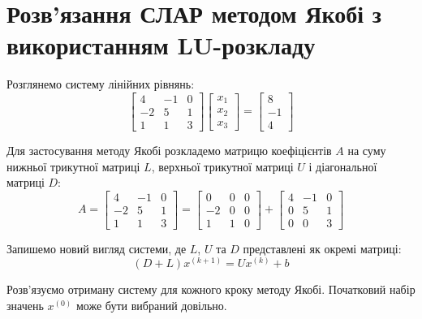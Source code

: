 \documentclass[12pt,a4paper]{article}
\begin{document}
 \section{Розв'язання СЛАР методом Якобі з використанням LU-розкладу}

Розглянемо систему лінійних рівнянь:
\[
\begin{bmatrix}
    4 & -1 & 0 \\
    -2 & 5 & 1 \\
    1 & 1 & 3
\end{bmatrix}
\begin{bmatrix}
    x_1 \\
    x_2 \\
    x_3
\end{bmatrix}
=
\begin{bmatrix}
    8 \\
    -1 \\
    4
\end{bmatrix}
\]

Для застосування методу Якобі розкладемо матрицю коефіцієнтів \(A\) на суму нижньої трикутної матриці \(L\), верхньої трикутної матриці \(U\) і діагональної матриці \(D\):
\[
A =
\begin{bmatrix}
    4 & -1 & 0 \\
    -2 & 5 & 1 \\
    1 & 1 & 3
\end{bmatrix}
=
\begin{bmatrix}
    0 & 0 & 0 \\
    -2 & 0 & 0 \\
    1 & 1 & 0
\end{bmatrix}
+
\begin{bmatrix}
    4 & -1 & 0 \\
    0 & 5 & 1 \\
    0 & 0 & 3
\end{bmatrix}
\]

Запишемо новий вигляд системи, де \(L\), \(U\) та \(D\) представлені як окремі матриці:
\[
(D + L) x^{(k+1)} = U x^{(k)} + b
\]

Розв'язуємо отриману систему для кожного кроку методу Якобі. Початковий набір значень \(x^{(0)}\) може бути вибраний довільно.
\end{document}
